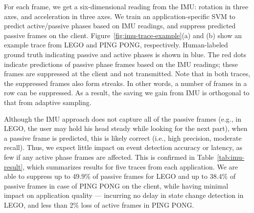 For each frame, we get a six-dimensional reading from the IMU:
rotation in three axes, and acceleration in three axes.  We train an
application-specific SVM to predict active/passive phases based on IMU
readings, and suppress predicted passive frames on the client.
Figure~\ref{fig:imu-trace-example}(a) and (b) show an example trace
from LEGO and PING PONG, respectively.  Human-labeled ground truth
indicating passive and active phases is shown in blue.  The red dots
indicate predictions of passive phase frames based on the IMU
readings; these frames are suppressed at the client and not
transmitted.  Note that in both traces, the suppressed frames also
form streaks. In other words, a number of frames in a row can be
suppressed. As a result, the saving we gain from IMU is orthogonal to
that from adaptive sampling.

Although the IMU approach does not capture all of the passive frames
(e.g., in LEGO, the user may hold his head steady while looking for
the next part), when a passive frame is predicted, this is likely
correct (i.e., high precision, moderate recall).  Thus, we expect
little impact on event detection accuracy or latency, as few if any
active phase frames are affected.  This is confirmed in
Table~\ref{tab:imu-result}, which summarizes results for five traces
from each application.  We are able to suppress up to 49.9\% of
passive frames for LEGO and up to 38.4\% of passive frames in case of
PING PONG on the client, while having minimal impact on application
quality --- incurring no delay in state change detection in LEGO, and
less than 2\% loss of active frames in PING PONG.

